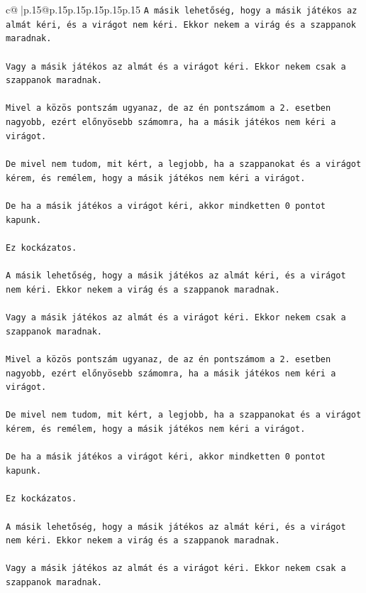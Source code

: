 \documentclass{article}
\begin{document}
{\begin{supertabular}{c@{$\;$}|p{.15\linewidth}@{}p{.15\linewidth}p{.15\linewidth}p{.15\linewidth}p{.15\linewidth}p{.15\linewidth}}
{{{\texttt{A másik lehetőség, hogy a másik játékos az almát kéri, és a virágot nem kéri. Ekkor nekem a virág és a szappanok maradnak.} \\
\\ 
\texttt{Vagy a másik játékos az almát és a virágot kéri. Ekkor nekem csak a szappanok maradnak.} \\
\\ 
\texttt{Mivel a közös pontszám ugyanaz, de az én pontszámom a 2. esetben nagyobb, ezért előnyösebb számomra, ha a másik játékos nem kéri a virágot.} \\
\\ 
\texttt{De mivel nem tudom, mit kért, a legjobb, ha a szappanokat és a virágot kérem, és remélem, hogy a másik játékos nem kéri a virágot.} \\
\\ 
\texttt{De ha a másik játékos a virágot kéri, akkor mindketten 0 pontot kapunk.} \\
\\ 
\texttt{Ez kockázatos.} \\
\\ 
\texttt{A másik lehetőség, hogy a másik játékos az almát kéri, és a virágot nem kéri. Ekkor nekem a virág és a szappanok maradnak.} \\
\\ 
\texttt{Vagy a másik játékos az almát és a virágot kéri. Ekkor nekem csak a szappanok maradnak.} \\
\\ 
\texttt{Mivel a közös pontszám ugyanaz, de az én pontszámom a 2. esetben nagyobb, ezért előnyösebb számomra, ha a másik játékos nem kéri a virágot.} \\
\\ 
\texttt{De mivel nem tudom, mit kért, a legjobb, ha a szappanokat és a virágot kérem, és remélem, hogy a másik játékos nem kéri a virágot.} \\
\\ 
\texttt{De ha a másik játékos a virágot kéri, akkor mindketten 0 pontot kapunk.} \\
\\ 
\texttt{Ez kockázatos.} \\
\\ 
\texttt{A másik lehetőség, hogy a másik játékos az almát kéri, és a virágot nem kéri. Ekkor nekem a virág és a szappanok maradnak.} \\
\\ 
\texttt{Vagy a másik játékos az almát és a virágot kéri. Ekkor nekem csak a szappanok maradnak.} \\
}}}
\end{supertabular}}
\end{document}
